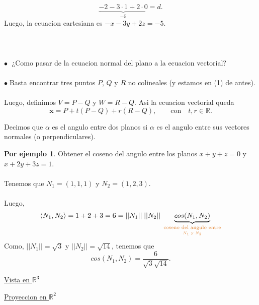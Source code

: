 \documentclass{article}
\theoremstyle{definition}
\newtheorem*{ej}{Por ejemplo}
\theoremstyle{remark}
\newcommand\bl{$\bullet\;$}
\begin{document}
\[ 
  \underbrace{-2-3\cdot 1 + 2\cdot 0 }_{-5}=d.
\] Luego, la ecuacion cartesiana es $-x-3y+2z = -5$.
\\\\\\\\
\textcolor{rojop2}{\bl} ¿Como pasar de la ecuacion normal del plano a la ecuacion vectorial? \\\\ \bl Basta encontrar tres puntos $P$, $Q$ y $R$ no colineales (y estamos en \textcolor{rojop2}{(1)} de antes). \\\\ Luego, definimos $V=P-Q$ y $W=R-Q$. Asi la ecuacion vectorial queda \[
  \mathbf{x}=P+t(P-Q)+r(R-Q),\quad \quad \text{con} \quad t,r \in \mathbb{R}.
\]
\begin{defi}
 Decimos que $\alpha$ es el angulo entre dos planos si $\alpha$ es el angulo entre sus vectores normales (o perpendiculares).
\end{defi}
\begin{ej}
  Obtener el coseno del angulo entre los planos $x+y+z=0$ y $x+2y+3z=1$. \\\\ Tenemos que $N_1=(1,1,1)$ y $N_2=(1,2,3)$. \\\\ Luego, \[ 
    \langle N_1,N_2 \rangle = 1+2+3=6= ||N_1|| \; ||N_2|| \; \underbrace{cos(N_1,N_2)}_{\textcolor{rojop2}{\underset{N_1 \text{ y } N_2}{\text{coseno del angulo entre}}}}
    \]  Como, $||N_1||=\sqrt{3}$ y $||N_2||=\sqrt{14}$, tenemos que \[ 
    cos(N_1,N_2)=\frac{6}{\sqrt{3}\sqrt{14}}.
  \]
\end{ej} \pagebreak
\underline{Vista en $\mathbb{R}^3$} 

\begin{figure}[h]
\centering
\def\svgwidth{0.55\textwidth}

\end{figure}

\underline{Proyeccion en $\mathbb{R}^2$}
\end{document}
